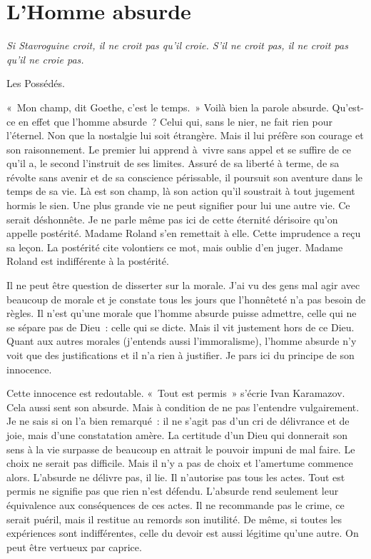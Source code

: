 \documentclass{book}
\begin{document}
\chapter{L’Homme absurde}

\emph{Si Stavroguine croit, il ne croit pas qu'il croie. S'il ne croit pas, il ne croit pas qu'il ne croie pas.}

Les Possédés.

« Mon champ, dit Goethe, c'est le temps. » Voilà bien la parole absurde. Qu'est-ce en effet que l'homme absurde ? Celui qui, sans le nier, ne fait rien pour l'éternel. Non que la nostalgie lui soit étrangère. Mais il lui préfère son courage et son raisonnement. Le premier lui apprend à vivre sans appel et se suffire de ce qu'il a, le second l'instruit de ses limites. Assuré de sa liberté à terme, de sa révolte sans avenir et de sa conscience périssable, il poursuit son aventure dans le temps de sa vie. Là est son champ, là son action qu'il soustrait à tout jugement hormis le sien. Une plus grande vie ne peut signifier pour lui une autre vie. Ce serait déshonnête. Je ne parle même pas ici de cette éternité dérisoire qu'on appelle postérité. Madame Roland s'en remettait à elle. Cette imprudence a reçu sa leçon. La postérité cite volontiers ce mot, mais oublie d'en juger. Madame Roland est indifférente à la postérité.

Il ne peut être question de disserter sur la morale. J'ai vu des gens mal agir avec beaucoup de morale et je constate tous les jours que l'honnêteté n'a pas besoin de règles. Il n'est qu'une morale que l'homme absurde puisse admettre, celle qui ne se sépare pas de Dieu : celle qui se dicte. Mais il vit justement hors de ce Dieu. Quant aux autres morales (j'entends aussi l'immoralisme), l'homme absurde n'y voit que des justifications et il n'a rien à justifier. Je pars ici du principe de son innocence.

Cette innocence est redoutable. « Tout est permis » s'écrie Ivan Karamazov. Cela aussi sent son absurde. Mais à condition de ne pas l'entendre vulgairement. Je ne sais si on l'a bien remarqué : il ne s'agit pas d'un cri de délivrance et de joie, mais d'une constatation amère. La certitude d'un Dieu qui donnerait son sens à la vie surpasse de beaucoup en attrait le pouvoir impuni de mal faire. Le choix ne serait pas difficile. Mais il n'y a pas de choix et l'amertume commence alors. L'absurde ne délivre pas, il lie. Il n'autorise pas tous les actes. Tout est permis ne signifie pas que rien n'est défendu. L'absurde rend seulement leur équivalence aux conséquences de ces actes. Il ne recommande pas le crime, ce serait puéril, mais il restitue au remords son inutilité. De même, si toutes les expériences sont indifférentes, celle du devoir est aussi légitime qu'une autre. On peut être vertueux par caprice.
\end{document}
